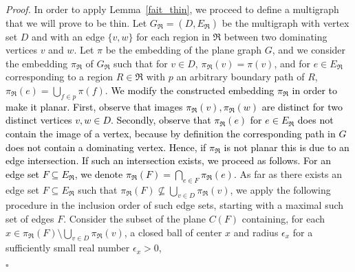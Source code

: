 \documentclass[a4paper,11pt]{article}
\newenvironment{proof}{\noindent \textit{Proof. }}{\hfill$\square$\vspace{.2cm}}
\newcommand{\addOK}   [1] {\textcolor{black} {#1}}
\newcommand{\modifOK} [2] {\addOK{#2}}
\begin{document}
\begin{proof}
In order to apply Lemma~\ref{fait_thin}, we proceed to define a multigraph that we will prove to be thin. Let $G_\Re =(D, E_\Re)$ be the multigraph with vertex set $D$ and with an edge $\{v,w\}$ for each region in $\Re$ between two dominating vertices $v$ and $w$. Let $\pi$ be the embedding of the plane graph $G$, and we consider the embedding $\pi_\Re$ of $G_\Re$ such that for $v \in D$, $\pi_\Re(v) = \pi(v)$,  and for $e \in E_\Re$ corresponding to a region $R \in \Re$ with $p$ an arbitrary boundary path of $R$, $\pi_\Re(e) = \bigcup_{f \in p} \pi(f)$. \modifOK{(note that such a path does not contain inner dominating vertices, hence $\pi_\Re(e)$ does not contain vertex images). For an edge set $F \subseteq E_\Re$, we denote $\pi_\Re(F) = \bigcap_{e\in F} \pi_\Re(e) $. If the constructed embedding is not planar, we proceed to modify it in order to make it planar as follows. Given $F,F' \subseteq E_\Re$, observe that if $F \subseteq F'$ then $\pi_\Re(F) \supseteq \pi_\Re(F')$.}{We modify the constructed embedding $\pi_\Re$ in order to make it planar. First, observe that images $\pi_\Re(v),\pi_\Re(w)$ are distinct for two distinct vertices $v,w \in D$. Secondly, observe that $\pi_\Re(e)$ for $e \in E_\Re$ does not contain the image of a vertex, because  by definition the corresponding path in $G$ does not contain a dominating vertex. Hence, if $\pi_\Re$ is not planar this is due to an edge intersection. If such an intersection exists, we proceed as follows. For an edge set $F \subseteq E_\Re$, we denote $\pi_\Re(F) = \bigcap_{e\in F} \pi_\Re(e) $.} As far as there
exists an edge set $F\subseteq E_\Re$ such that $\pi_\Re(F) \nsubseteq \bigcup_{v \in D} \pi_\Re(v)$, we apply the following procedure in the inclusion order of such edge sets, starting with a maximal such set of edges $F$.
Consider the subset of the plane $C(F)$ containing, for each $x\in \pi_\Re(F) \setminus \bigcup_{v \in D} \pi_\Re(v)$, a closed ball of center $x$ and radius $\epsilon_x$ for a sufficiently small real number $\epsilon_x > 0$,

\end{proof}
\end{document}
